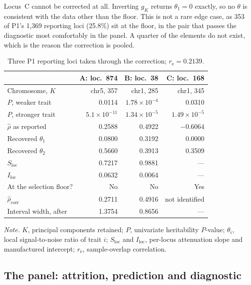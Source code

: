 \documentclass[12pt,a4paper]{article}
\newcommand{\rh}{\hat{\rho}}
\newcommand{\Slocus}{S_{\mathrm{loc}}}
\newcommand{\Ilocus}{I_{\mathrm{loc}}}
\newcommand{\re}{r_{\mathrm{e}}}
\begin{document}
Locus~C cannot be corrected at all. Inverting $g_K$ returns $\theta_1=0$ exactly, so no
$\theta$ is consistent with the data other than the floor. This is not a rare edge case, as
353 of P1's 1,369 reporting loci (25.8\%) sit at the floor, in the pair that passes the
diagnostic most comfortably in the panel. A quarter of the elements do not exist, which is
the reason the correction is pooled.

\begin{table}[htbp]
\caption{Three P1 reporting loci taken through the correction;
$\re=0.2139$.}\label{tab:worked}
\small
\begin{center}
\begin{tabular}{@{}lrrr@{}}
\toprule
& A: loc.\ 874 & B: loc.\ 38 & C: loc.\ 168 \\
\midrule
Chromosome, $K$         & chr5, 357 & chr1, 285 & chr1, 345 \\
$P$, weaker trait       & 0.0114 & $1.78\times10^{-4}$ & 0.0310 \\
$P$, stronger trait     & $5.1\times10^{-11}$ & $1.34\times10^{-5}$ & $1.49\times10^{-5}$ \\
$\rh$ as reported       & 0.2588 & 0.4922 & $-0.6064$ \\
Recovered $\theta_1$    & 0.0800 & 0.3192 & 0.0000 \\
Recovered $\theta_2$    & 0.5660 & 0.3913 & 0.3509 \\
$\Slocus$               & 0.7217 & 0.9881 & --- \\
$\Ilocus$               & 0.0632 & 0.0064 & --- \\
At the selection floor? & No & No & Yes \\
$\rh_{\mathrm{corr}}$   & 0.2711 & 0.4916 & not identified \\
Interval width, after   & 1.3754 & 0.8656 & --- \\
\bottomrule
\end{tabular}
\par\smallskip\footnotesize\noindent \textit{Note.} $K$, principal components retained; $P$, univariate heritability $P$-value; $\theta_i$, local signal-to-noise ratio of trait $i$; $\Slocus$ and $\Ilocus$, per-locus attenuation slope and manufactured intercept; $\re$, sample-overlap correlation.
\end{center}
\end{table}

\subsection{The panel: attrition, prediction and diagnostic}\label{sec:panel}
\end{document}
